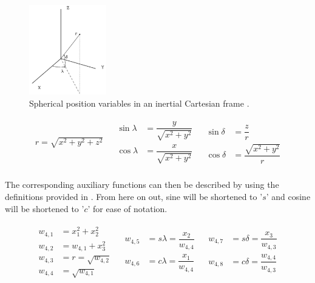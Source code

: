  \begin{figure}[H]
\centering
\includegraphics[width=0.3\textwidth]{figures/reference_frames/sphertocart_noomen2013basic.jpg}
\caption{Spherical position variables in an inertial Cartesian frame \citep{noomen2013basic}.}
\label{fig:sphertocart_noomen2013basic}
\end{figure}

\begin{align} \label{eq:transAngl}
\begin{split}
r = \sqrt{x^{2}+y^{2}+z^{2}}\\
\end{split}
&
\begin{split}
\sin \lambda &= \dfrac{y}{\sqrt{x^{2}+y^{2}}}\\
\cos \lambda &= \dfrac{x}{\sqrt{x^{2}+y^{2}}}\\
\end{split}
&
\begin{split}
\sin \delta &= \dfrac{z}{r}\\
\cos \delta &= \dfrac{\sqrt{x^{2}+y^{2}}}{r}
\end{split} 
\end{align} 

\noindent
The corresponding auxiliary functions can then be described by  using the definitions provided in . From here on out, sine will be shortened to '$s$' and cosine will be shortened to '$c$' for ease of notation.

\begin{align} \label{eq:auxFtransAngl}
\begin{split}
w_{4,1} &= x_{1}^{2}+x_{2}^{2} \\
w_{4,2} &= w_{4,1}+x_{3}^{2} \\
w_{4,3} &= r = \sqrt{w_{4,2}} \\
w_{4,4} &= \sqrt{w_{4,1}} \\
\end{split}
&
\begin{split}
w_{4,5} &= s\lambda = \dfrac{x_{2}}{w_{4,4}}\\
w_{4,6} &= c\lambda = \dfrac{x_{1}}{w_{4,4}} \\
\end{split}
&
\begin{split}
w_{4,7} &= s\delta = \dfrac{x_{3}}{w_{4,3}} \\
w_{4,8} &= c\delta = \dfrac{w_{4,4}}{w_{4,3}}\\
\end{split} 
\end{align} 

